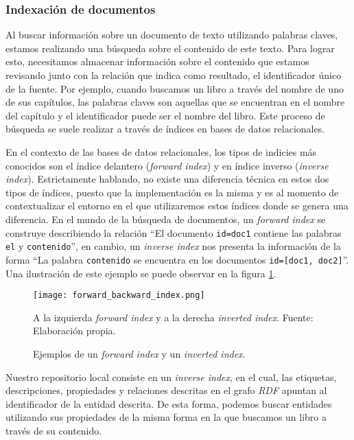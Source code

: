 \subsubsection{Indexación de documentos}
\label{sec:index-types}

Al buscar información sobre un documento de texto utilizando palabras claves,
estamos realizando una búsqueda sobre el contenido de este texto. Para lograr
esto, necesitamos almacenar información sobre el contenido que estamos revisando
junto con la relación que indica como resultado, el identificador único de la
fuente. Por ejemplo, cuando buscamos un libro a través del nombre de uno de sus
capítulos, las palabras claves son aquellas que se encuentran en el nombre del
capítulo y el identificador puede ser el nombre del libro. Este proceso de
búsqueda se suele realizar a través de índices en bases de datos relacionales.

En el contexto de las bases de datos relacionales, los tipos de indicies más
conocidos son el índice delantero (\textit{forward index}) y en índice inverso
(\textit{inverse index}). Estrictamente hablando, no existe una diferencia
técnica en estos dos tipos de índices, puesto que la implementación es la misma
y es al momento de contextualizar el entorno en el que utilizaremos estos
índices donde se genera una diferencia. En el mundo de la búsqueda de
documentos, un \textit{forward index} se construye describiendo la relación
``El documento \texttt{id=doc1} contiene las palabras \texttt{el} y
\texttt{contenido}'', en cambio, un \textit{inverse index} nos presenta la
información de la forma ``La palabra \texttt{contenido} se encuentra en los
documentos \texttt{id=[doc1, doc2]}''. Una ilustración de este ejemplo se puede
observar en la figura \ref{fig:forward-backward-index}.

\begin{figure}
    \centering
    \texttt{[image: forward\_backward\_index.png]}
    \caption{Ejemplos de un \textit{forward index} y un \textit{inverted
    index}.} A la izquierda \textit{forward index} y a la derecha
    \textit{inverted index}. Fuente: Elaboración propia.
    \label{fig:forward-backward-index}
\end{figure}

Nuestro repositorio local consiste en un \textit{inverse index}, en el cual, las
etiquetas, descripciones, propiedades y relaciones descritas en el grafo
\textit{RDF} apuntan al identificador de la entidad descrita. De esta forma,
podemos buscar entidades utilizando sus propiedades de la misma forma en la que
buscamos un libro a través de su contenido.

